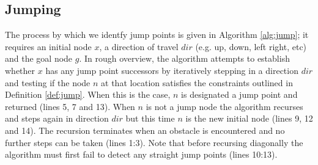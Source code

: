 \subsection{Jumping}
The process by which we identfy jump points is given in Algorithm
\ref{alg:jump}; it requires an initial node $x$, a direction of travel $dir$
(e.g. up, down, left right, etc) and the goal node $g$.
In rough overview, the algorithm attempts to establish whether $x$ has any 
jump point successors by iteratively stepping in a direction $dir$ and testing
if the node $n$ at that location satisfies the constraints outlined in 
Definition \ref{def:jump}.
When this is the case, $n$ is designated a jump point and returned (lines 5, 7
and 13).
When $n$ is not a jump node the algorithm recurses and steps again in direction
$dir$ but this time $n$ is the new initial node (lines 9, 12 and 14).
The recursion terminates when an obstacle is encountered and no further
steps can be taken (lines 1:3).
Note that before recursing diagonally the algorithm must first 
fail to detect any straight jump points (lines 10:13).
\par



